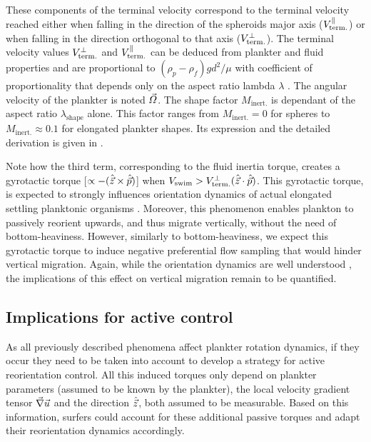 These components of the terminal velocity correspond to the terminal velocity reached either when falling in the direction of the spheroids major axis ($V_{\mathrm{term.}}^\parallel$) or when falling in the direction orthogonal to that axis ($V_{\mathrm{term.}}^\perp$). 
The terminal velocity values $V_{\mathrm{term.}}^\perp$ and $V_{\mathrm{term.}}^\parallel$ can be deduced from plankter and fluid properties and are proportional to $(\rho_p - \rho_f) g d^2 / \mu$ with coefficient of proportionality that depends only on the aspect ratio lambda $\lambda$ \citep{dahlkild2011finite, ardekani2017sedimentation, gustavsson2019effect}.
The angular velocity of the plankter is noted $\vec{\varOmega}$. 
The shape factor $M_{\mathrm{inert.}}$ is dependant of the aspect ratio $\lambda_{\mathrm{shape}}$ alone.
This factor ranges from $M_{\mathrm{inert.}} = 0$ for spheres to $M_{\mathrm{inert.}} \approx 0.1$ for elongated plankter shapes. 
Its expression and the detailed derivation is given in \citet{qiu2022gyrotactic}.

Note how the third term, corresponding to the fluid inertia torque, creates a gyrotactic torque [$\propto - (\hat{\vec{z}} \times \hat{\vec{p}})$] when $V_{\mathrm{swim}} > V_{\mathrm{term.}}^\perp (\hat{\vec{z}} \cdot \hat{\vec{p}})$.
This gyrotactic torque, is expected to strongly influences orientation dynamics of actual elongated settling planktonic organisms \citep{qiu2022gyrotactic}.
Moreover, this phenomenon enables plankton to passively reorient upwards, and thus migrate vertically, without the need of bottom-heaviness.
However, similarly to bottom-heaviness, we expect this gyrotactic torque to induce negative preferential flow sampling that would hinder vertical migration.
Again, while the orientation dynamics are well understood \citep{qiu2022gyrotactic}, the implications of this effect on vertical migration remain to be quantified. 

\subsection{Implications for active control}

As all previously described phenomena affect plankter rotation dynamics, if they occur they need to be taken into account to develop a strategy for active reorientation control.
All this induced torques only depend on plankter parameters (assumed to be known by the plankter), the local velocity gradient tensor $\vec{\nabla} \vec{u}$ and the direction $\hat{\vec{z}}$, both assumed to be measurable.
Based on this information, surfers could account for these additional passive torques and adapt their reorientation dynamics accordingly.

